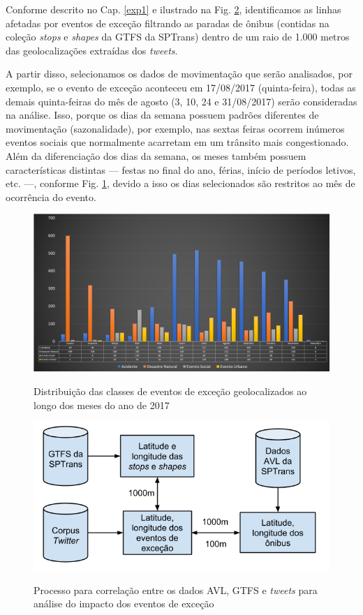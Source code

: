 \documentclass[
	12pt,				%
	oneside,			%
	a4paper,			%
	english,			%
	brazil				%
	]{abntex2ppgsi}
\begin{document}
{{Conforme descrito no Cap. \ref{exp1} e ilustrado na Fig. \ref{fig:avl_tweets_correlation_pt}, identificamos as linhas afetadas por eventos de exceção filtrando as paradas de ônibus (contidas na coleção \textit{stops}  e \textit{shapes} da GTFS da SPTrans) dentro de um raio de 1.000 metros das geolocalizações extraídas dos \textit{tweets}. 

A partir disso, selecionamos os dados de movimentação que serão analisados, por exemplo, se o evento de exceção aconteceu em 17/08/2017 (quinta-feira), todas as demais quinta-feiras do mês de agosto (3, 10, 24 e 31/08/2017) serão consideradas na análise. Isso, porque os dias da semana possuem padrões diferentes de movimentação (sazonalidade), por exemplo, nas sextas feiras ocorrem inúmeros eventos sociais que normalmente acarretam em um trânsito mais congestionado. Além da diferenciação dos dias da semana, os meses também possuem características distintas --- festas no final do ano, férias, início de períodos letivos, etc. ---, conforme Fig. \ref{fig:exception_events_classification_distribution}, devido a isso os dias selecionados são restritos ao mês de ocorrência do evento.

\begin{figure}[!htb]
	\centering
 	  \caption{Distribuição das classes de eventos de exceção geolocalizados ao longo dos meses do ano de 2017}
		\includegraphics[width=1\linewidth]{images/exception_events_classification_distribution_pt.png}
	\label{fig:exception_events_classification_distribution}
\end{figure}

\begin{figure}[!htb]
	\centering
 	  \caption{Processo para correlação entre os dados AVL, GTFS e \textit{tweets} para análise do impacto dos eventos de exceção}
		\includegraphics[width=0.7\linewidth]{images/avl_tweets_correlation_pt.png}
	\label{fig:avl_tweets_correlation_pt}
\end{figure}

}}
\end{document}
